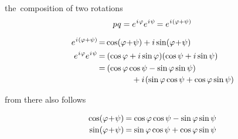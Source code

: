 the~composition of two rotations
\begin{equation*}
p \hspace{.1ex} q = e^{\hspace{.1ex} i \hspace{.1ex} \varphi} e^{\hspace{.1ex} i \hspace{.1ex} \psi} \hspace{-0.2ex} = e^{\hspace{.1ex} i \hspace{.1ex} ( \varphi + \psi )}
\end{equation*}

\begin{align*}
\exponentofimaginary{(\varphi + \psi)} \hspace{-0.3ex}
= & \cosine ( \varphi {\hspace{.1ex} + \hspace{.1ex}} \psi ) + i \sine ( \varphi {\hspace{.1ex} + \hspace{.1ex}} \psi )
\\
%
\exponentofimaginary{\varphi} \exponentofimaginary{\psi} \hspace{-0.2ex}
= & \hspace{.5ex} ( \cosine \varphi + i \sine \varphi ) ( \cosine \psi + i \sine \psi )
\\
%
= & \hspace{.5ex} \begin{multlined}[t]
( \cosine \varphi \cosine \psi - \sine \varphi \sine \psi )
\\
\hspace{2em} + i \hspace{.2ex} ( \sine \varphi \cosine \psi + \cosine \varphi \sine \psi )
\end{multlined}
\end{align*}

\noindent
from there also follows

\begin{equation*}
\begin{array}{r@{\hspace{.22em}}c@{\hspace{.25em}}l}
\cosine ( \varphi {\hspace{.1ex} + \hspace{.1ex}} \psi )
& = &
\cosine \varphi \cosine \psi - \sine \varphi \sine \psi
\\[.2em]
%
\sine ( \varphi {\hspace{.1ex} + \hspace{.1ex}} \psi )
& = &
\sine \varphi \cosine \psi + \cosine \varphi \sine \psi
\end{array}
\end{equation*}

